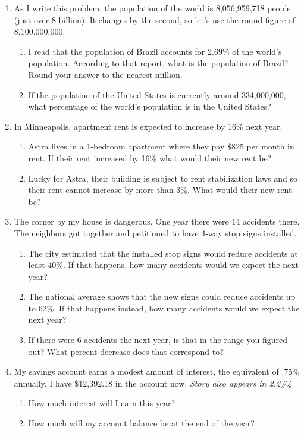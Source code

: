 \begin{enumerate}

\item As I write this problem, the population of the world is 8,056,959,718 people (just over 8 billion).  It changes by the second, so let's use the round figure of 8,100,000,000.
\begin{enumerate}
\item I read that the population of Brazil accounts for 2.69\% of the world's population.  According to that report, what is the population of Brazil?  Round your answer to the nearest million.  \vfill
\item If the population of the United States is currently around 334,000,000, what percentage of the world's population is in the United States? \vfill
\end{enumerate}

\item In Minneapolis, apartment rent is expected to increase by 16\% next year. \begin{enumerate}
\item Astra lives in a 1-bedroom apartment where they pay \$825 per month in rent.  If their rent increased by 16\% what would their new rent be? \vfill
\item Lucky for Astra, their building is subject to rent stabilization laws and so their rent cannot increase by more than 3\%. What would their new rent be? \vfill
\end{enumerate}

\newpage

\item The corner by my house is dangerous.  One year there were 14 accidents there.  The neighbors got together and petitioned to have 4-way stop signs installed.  
\begin{enumerate}
\item The city estimated that the installed stop signs would reduce accidents at least 40\%.  If that happens, how many accidents would we expect the next year? \vfill
\item The national average shows that the new signs could reduce accidents up to 62\%.  If that happens instead, how many accidents would we expect the next year? \vfill
\item If there were 6 accidents the next year, is that in the range you figured out? What percent decrease does that correspond to? \vfill 
\end{enumerate}

\item My savings account earns a modest amount of interest, the equivalent of .75\% annually.  I have \$12,392.18 in the account now.  \hspace{.7 in} \emph{Story also appears in 2.2\#4}
\begin{enumerate}
\item How much interest will I earn this year? \vfill
\item How much will my account balance be at the end of the year? \vfill
\end{enumerate}

\end{enumerate} %

